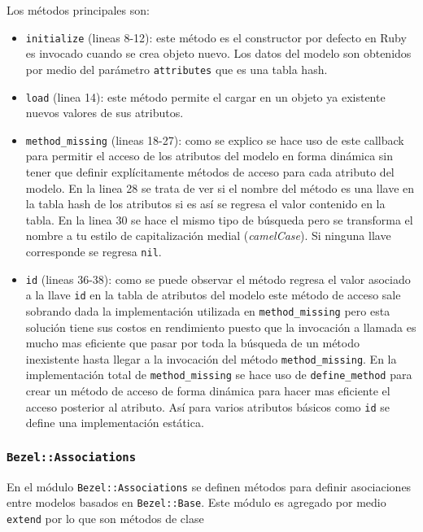 Los métodos principales son:
\begin{itemize}
\item \texttt{initialize} (lineas 8-12): este método es el constructor por defecto
  en Ruby es invocado cuando se crea objeto nuevo. Los datos del modelo son obtenidos
  por medio del parámetro \texttt{attributes} que es una tabla hash.
\item \texttt{load} (linea 14): este método permite el cargar en un objeto ya
  existente nuevos valores de sus atributos.
\item \texttt{method\_missing} (lineas 18-27): como se explico se hace uso de este
  callback para permitir el acceso de los atributos del modelo en forma dinámica sin
  tener que definir explícitamente métodos de acceso para cada atributo del modelo.
  En la linea 28 se trata de ver si el nombre del método es una llave en la tabla
  hash de los atributos si es así se regresa el valor contenido en la tabla.
  En la linea 30 se hace el mismo tipo de búsqueda pero se transforma el
  nombre a tu estilo de capitalización medial (\textit{camelCase}).
  Si ninguna llave corresponde se regresa \texttt{nil}.
\item \texttt{id} (lineas 36-38): como se puede observar el método regresa
  el valor asociado a la llave \texttt{id} en la tabla de atributos del modelo
  este método de acceso sale sobrando dada la implementación utilizada
  en \texttt{method\_missing} pero esta solución tiene sus costos en rendimiento
  puesto que la invocación a llamada es mucho mas eficiente que pasar por toda
  la búsqueda de un método inexistente hasta llegar a la invocación del método
  \texttt{method\_missing}. En la implementación total de \texttt{method\_missing}
  se hace uso de \texttt{define\_method} para crear un método de acceso
  de forma dinámica para hacer mas eficiente el acceso posterior al atributo.
  Así para varios atributos básicos como \texttt{id} se define una implementación
  estática.
\end{itemize}

\subsubsection{\texttt{Bezel::Associations}}

En el módulo \texttt{Bezel::Associations} se definen métodos para definir
asociaciones entre modelos basados en \texttt{Bezel::Base}. Este módulo
es agregado por medio \texttt{extend} por lo que son métodos de clase


